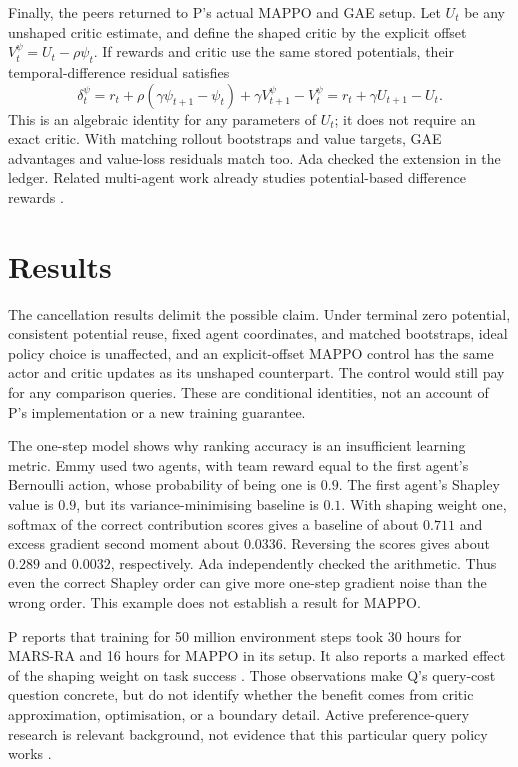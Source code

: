 \documentclass{article}
\begin{document}
Finally, the peers returned to P's actual MAPPO and GAE setup. Let \(U_t\) be any unshaped critic estimate, and define the shaped critic by the explicit offset \(V_t^\psi=U_t-\rho\psi_t\). If rewards and critic use the same stored potentials, their temporal-difference residual satisfies
\[
\delta_t^\psi=r_t+\rho(\gamma\psi_{t+1}-\psi_t)
+\gamma V_{t+1}^\psi-V_t^\psi
=r_t+\gamma U_{t+1}-U_t.
\]
This is an algebraic identity for any parameters of \(U_t\); it does not require an exact critic. With matching rollout bootstraps and value targets, GAE advantages and value-loss residuals match too. Ada checked the extension in the ledger. Related multi-agent work already studies potential-based difference rewards \cite{li2022}.

\section{Results}

The cancellation results delimit the possible claim. Under terminal zero potential, consistent potential reuse, fixed agent coordinates, and matched bootstraps, ideal policy choice is unaffected, and an explicit-offset MAPPO control has the same actor and critic updates as its unshaped counterpart. The control would still pay for any comparison queries. These are conditional identities, not an account of P's implementation or a new training guarantee.

The one-step model shows why ranking accuracy is an insufficient learning metric. Emmy used two agents, with team reward equal to the first agent's Bernoulli action, whose probability of being one is \(0.9\). The first agent's Shapley value is \(0.9\), but its variance-minimising baseline is \(0.1\). With shaping weight one, softmax of the correct contribution scores gives a baseline of about \(0.711\) and excess gradient second moment about \(0.0336\). Reversing the scores gives about \(0.289\) and \(0.0032\), respectively. Ada independently checked the arithmetic. Thus even the correct Shapley order can give more one-step gradient noise than the wrong order. This example does not establish a result for MAPPO.

P reports that training for 50 million environment steps took 30 hours for MARS-RA and 16 hours for MAPPO in its setup. It also reports a marked effect of the shaping weight on task success \cite{P}. Those observations make Q's query-cost question concrete, but do not identify whether the benefit comes from critic approximation, optimisation, or a boundary detail. Active preference-query research is relevant background, not evidence that this particular query policy works \cite{active2025}.
\end{document}
